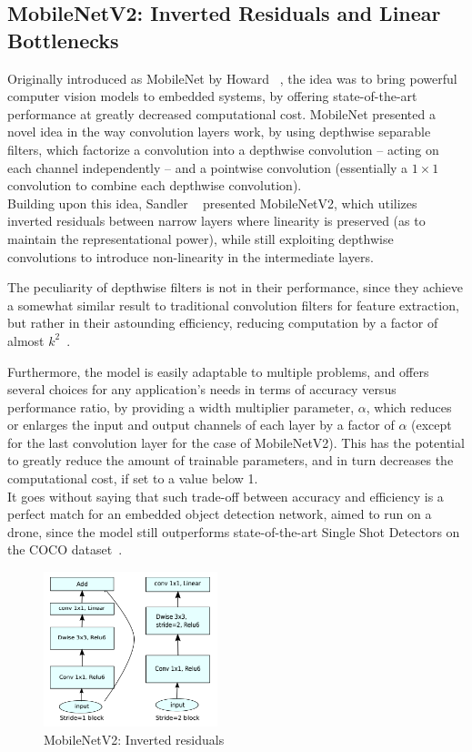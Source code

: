 \subsection{MobileNetV2: Inverted Residuals and Linear Bottlenecks}

Originally introduced as MobileNet by Howard \etal~\cite{MobileNet}, the idea
was to bring powerful computer vision models to embedded systems, by offering
state-of-the-art performance at greatly decreased computational cost. MobileNet
presented a novel idea in the way convolution layers work, by using depthwise
separable filters, which factorize a convolution into a depthwise convolution
-- acting on each channel independently -- and a pointwise convolution
(essentially a $1\times1$ convolution to combine each depthwise convolution).\\

Building upon this idea, Sandler \etal~\cite{MobileNetV2} presented
MobileNetV2, which utilizes inverted residuals between narrow layers where
linearity is preserved (as to maintain the representational power), while still
exploiting depthwise convolutions to introduce non-linearity in the
intermediate layers.

The peculiarity of depthwise filters is not in their performance, since they
achieve a somewhat similar result to traditional convolution filters for
feature extraction, but rather in their astounding efficiency, reducing
computation by a factor of almost $k^2$~\cite{MobileNetV2}.

Furthermore, the model is easily adaptable to multiple problems, and offers
several choices for any application's needs in terms of accuracy versus
performance ratio, by providing a width multiplier parameter, $\alpha$, which
reduces or enlarges the input and output channels of each layer by a factor of
$\alpha$ (except for the last convolution layer for the case of MobileNetV2).
This has the potential to greatly reduce the amount of trainable parameters,
and in turn decreases the computational cost, if set to a value below 1.\\

It goes without saying that such trade-off between accuracy and efficiency is a
perfect match for an embedded object detection network, aimed to run on a
drone, since the model still outperforms state-of-the-art Single Shot Detectors
on the COCO dataset~\cite{MobileNetV2}.

\begin{figure}[h]
	\centering
	\includegraphics[width=0.45\textwidth]{figure/mobilenetv2.png}
	\caption{MobileNetV2: Inverted residuals}
	\label{fig:invertedresiduals}
\end{figure}

